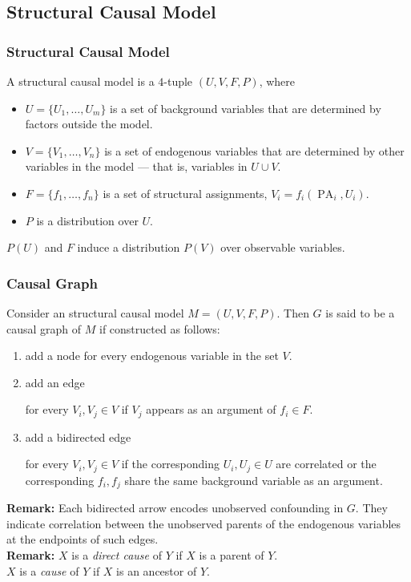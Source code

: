 \documentclass[UTF8,11pt,colorlinks,compress,openany]{beamer}%
\begin{document}
\subsection{Structural Causal Model}

\begin{frame}\frametitle{Structural Causal Model}
\begin{definition}
	A structural causal model is a $4$-tuple $(U, V, F, P)$, where
	\begin{itemize}
		\item $U=\{U_1,\dots,U_m\}$ is a set of background variables that are determined by factors outside the model.
		\item $V=\{V_1,\dots,V_n\}$ is a set of endogenous variables that are determined by other variables in the model --- that is, variables in $U\cup V$.
		\item $F=\{f_1,\dots,f_n\}$ is a set of structural assignments, $V_i=f_i(\operatorname{PA}_i,U_i)$.
		\item $P$ is a distribution over $U$.
	\end{itemize}
	$P(U)$ and $F$ induce a distribution $P(V)$ over observable variables.
\end{definition}
\end{frame}

\begin{frame}\frametitle{Causal Graph}
\begin{definition}
Consider an structural causal model $M=(U,V,F,P)$. Then $G$ is said to be a causal graph of $M$ if constructed as follows:
\begin{enumerate}
	\item add a node for every endogenous variable in the set $V$.
	\item add an edge  for every $V_i,V_j\in V$ if $V_j$ appears as an argument of $f_i\in F$.
	\item add a bidirected edge  for every $V_i,V_j\in V$ if the corresponding $U_i,U_j\in U$ are correlated or the corresponding $f_i,f_j$ share the same background variable as an argument.
\end{enumerate}
\end{definition}
\textbf{Remark:} Each bidirected arrow encodes unobserved confounding in $G$. They indicate correlation between the unobserved parents of the endogenous variables at the endpoints of such edges.\\
\textbf{Remark:} $X$ is a \emph{direct cause} of $Y$ if $X$ is a parent of $Y$.\\
$X$ is a \emph{cause} of $Y$ if $X$ is an ancestor of $Y$.
\end{frame}
\end{document}
